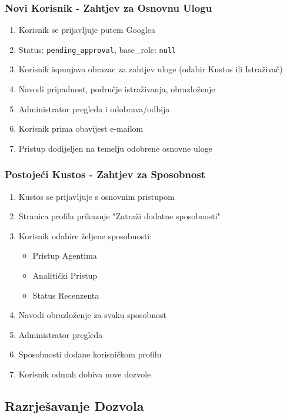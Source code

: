 \documentclass[12pt,a4paper]{article}
\begin{document}
\subsubsection{Novi Korisnik - Zahtjev za Osnovnu Ulogu}
\begin{enumerate}
    \item Korisnik se prijavljuje putem Googlea
    \item Status: \texttt{pending\_approval}, base\_role: \texttt{null}
    \item Korisnik ispunjava obrazac za zahtjev uloge (odabir Kustos ili Istraživač)
    \item Navodi pripadnost, područje istraživanja, obrazloženje
    \item Administrator pregleda i odobrava/odbija
    \item Korisnik prima obavijest e-mailom
    \item Pristup dodijeljen na temelju odobrene osnovne uloge
\end{enumerate}

\subsubsection{Postojeći Kustos - Zahtjev za Sposobnost}
\begin{enumerate}
    \item Kustos se prijavljuje s osnovnim pristupom
    \item Stranica profila prikazuje "Zatraži dodatne sposobnosti"
    \item Korisnik odabire željene sposobnosti:
    \begin{itemize}
        \item Pristup Agentima
        \item Analitički Pristup
        \item Status Recenzenta
    \end{itemize}
    \item Navodi obrazloženje za svaku sposobnost
    \item Administrator pregleda
    \item Sposobnosti dodane korisničkom profilu
    \item Korisnik odmah dobiva nove dozvole
\end{enumerate}

\subsection{Razrješavanje Dozvola}
\end{document}
